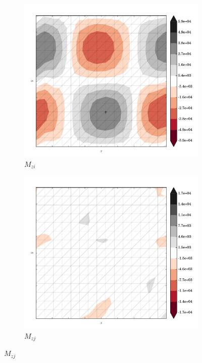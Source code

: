 \begin{figure}
  \begin{subfigure}[b]{0.3\linewidth}
    \includegraphics[width=\linewidth]{images/stress_balance/BP/M_zi.pdf}
  \caption{$M_{zi}$}
  \label{bp_M_zi}
  \end{subfigure}
  \begin{subfigure}[b]{0.3\linewidth}
    \includegraphics[width=\linewidth]{images/stress_balance/BP/M_zj.pdf}
  \caption{$M_{zj}$}
  \label{bp_M_zj}
  \end{subfigure}

\end{figure}
